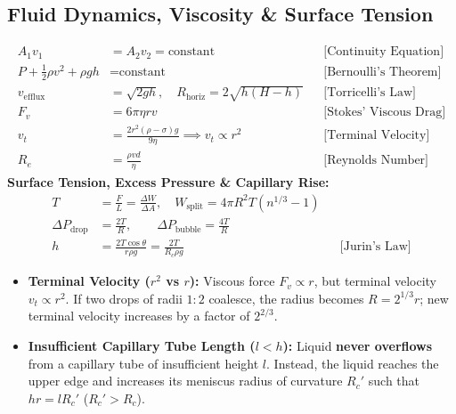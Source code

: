 \documentclass[10pt,twoside,openright]{book}
\begin{document}
\subsection{Fluid Dynamics, Viscosity \& Surface Tension}

\begin{formulabox}
\begin{align}
  A_1 v_1 &= A_2 v_2 = \text{constant} && \text{[Continuity Equation]} \\
  P + \frac{1}{2}\rho v^2 + \rho g h &= \text{constant} && \text{[Bernoulli's Theorem]} \\
  v_{\text{efflux}} &= \sqrt{2gh}, \quad R_{\text{horiz}} = 2\sqrt{h(H-h)} && \text{[Torricelli's Law]} \\
  F_v &= 6\pi \eta r v && \text{[Stokes' Viscous Drag]} \\
  v_t &= \frac{2 r^2(\rho - \sigma)g}{9\eta} \implies v_t \propto r^2 && \text{[Terminal Velocity]} \\
  R_e &= \frac{\rho v d}{\eta} && \text{[Reynolds Number]}
\end{align}
\textbf{Surface Tension, Excess Pressure \& Capillary Rise:}
\begin{align}
  T &= \frac{F}{L} = \frac{\Delta W}{\Delta A}, \quad W_{\text{split}} = 4\pi R^2 T(n^{1/3} - 1) \\
  \Delta P_{\text{drop}} &= \frac{2T}{R}, \qquad \Delta P_{\text{bubble}} = \frac{4T}{R} \\
  h &= \frac{2T\cos\theta}{r\rho g} = \frac{2T}{R_c \rho g} && \text{[Jurin's Law]}
\end{align}
\end{formulabox}

\begin{trapbox}
\begin{itemize}
  \item \textbf{Terminal Velocity ($r^2$ vs $r$):} Viscous force $F_v \propto r$, but terminal velocity $v_t \propto r^2$. If two drops of radii $1:2$ coalesce, the radius becomes $R = 2^{1/3}r$; new terminal velocity increases by a factor of $2^{2/3}$.
  \item \textbf{Insufficient Capillary Tube Length ($l < h$):} Liquid \textbf{never overflows} from a capillary tube of insufficient height $l$. Instead, the liquid reaches the upper edge and increases its meniscus radius of curvature $R_c'$ such that $h r = l R_c'$ ($R_c' > R_c$).
\end{itemize}
\end{trapbox}
\end{document}
